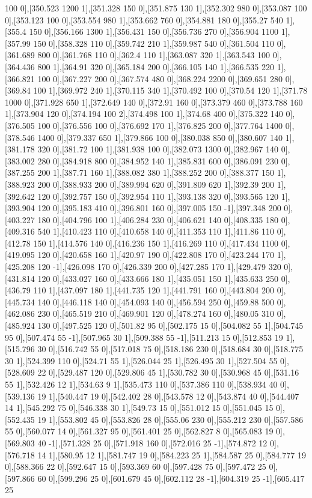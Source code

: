 {100 0],[350.523 1200 1],[351.328 150 0],[351.875 130 1],[352.302 980 0],[353.087 100 0],[353.123 100 0],[353.554 980 1],[353.662 760 0],[354.881 180 0],[355.27 540 1],[355.4 150 0],[356.166 1300 1],[356.431 150 0],[356.736 270 0],[356.904 1100 1],[357.99 150 0],[358.328 110 0],[359.742 210 1],[359.987 540 0],[361.504 110 0],[361.689 800 0],[361.768 110 0],[362.4 110 1],[363.087 320 1],[363.543 100 0],[364.436 800 1],[364.91 320 0],[365.184 200 0],[366.105 140 1],[366.535 220 1],[366.821 100 0],[367.227 200 0],[367.574 480 0],[368.224 2200 0],[369.651 280 0],[369.84 100 1],[369.972 240 1],[370.115 340 1],[370.492 100 0],[370.54 120 1],[371.78 1000 0],[371.928 650 1],[372.649 140 0],[372.91 160 0],[373.379 460 0],[373.788 160 1],[373.904 120 0],[374.194 100 2],[374.498 100 1],[374.68 400 0],[375.322 140 0],[376.505 100 0],[376.556 100 0],[376.692 170 1],[376.825 200 0],[377.764 1400 0],[378.546 1400 0],[379.337 650 1],[379.866 100 0],[380.038 850 0],[380.607 140 1],[381.178 320 0],[381.72 100 1],[381.938 100 0],[382.073 1300 0],[382.967 140 0],[383.002 280 0],[384.918 800 0],[384.952 140 1],[385.831 600 0],[386.091 230 0],[387.255 200 1],[387.71 160 1],[388.082 380 1],[388.252 200 0],[388.377 150 1],[388.923 200 0],[388.933 200 0],[389.994 620 0],[391.809 620 1],[392.39 200 1],[392.642 120 0],[392.757 150 0],[392.954 110 1],[393.138 320 0],[393.565 120 1],[393.904 120 0],[395.183 410 0],[396.801 160 0],[397.005 150 -1],[397.348 200 0],[403.227 180 0],[404.796 100 1],[406.284 230 0],[406.621 140 0],[408.335 180 0],[409.316 540 1],[410.423 110 0],[410.658 140 0],[411.353 110 1],[411.86 110 0],[412.78 150 1],[414.576 140 0],[416.236 150 1],[416.269 110 0],[417.434 1100 0],[419.095 120 0],[420.658 160 1],[420.97 190 0],[422.808 170 0],[423.244 170 1],[425.208 120 -1],[426.098 170 0],[426.339 200 0],[427.285 170 1],[429.479 320 0],[431.814 120 0],[433.027 160 0],[433.666 180 1],[435.051 150 1],[435.633 250 0],[436.79 110 1],[437.097 180 1],[441.735 120 1],[441.791 160 0],[443.804 200 0],[445.734 140 0],[446.118 140 0],[454.093 140 0],[456.594 250 0],[459.88 500 0],[462.086 230 0],[465.519 210 0],[469.901 120 0],[478.274 160 0],[480.05 310 0],[485.924 130 0],[497.525 120 0],[501.82 95 0],[502.175 15 0],[504.082 55 1],[504.745 95 0],[507.474 55 -1],[507.965 30 1],[509.388 55 -1],[511.213 15 0],[512.853 19 1],[515.796 30 0],[516.742 55 0],[517.018 75 0],[518.186 230 0],[518.684 30 0],[518.775 30 1],[524.399 110 0],[524.71 55 1],[526.044 25 1],[526.495 30 1],[527.504 55 0],[528.609 22 0],[529.487 120 0],[529.806 45 1],[530.782 30 0],[530.968 45 0],[531.16 55 1],[532.426 12 1],[534.63 9 1],[535.473 110 0],[537.386 110 0],[538.934 40 0],[539.136 19 1],[540.447 19 0],[542.402 28 0],[543.578 12 0],[543.874 40 0],[544.407 14 1],[545.292 75 0],[546.338 30 1],[549.73 15 0],[551.012 15 0],[551.045 15 0],[552.435 19 1],[553.802 45 0],[553.826 28 0],[555.06 230 0],[555.212 230 0],[557.586 55 0],[560.077 14 0],[561.327 95 0],[561.401 25 0],[562.827 8 0],[565.083 19 0],[569.803 40 -1],[571.328 25 0],[571.918 160 0],[572.016 25 -1],[574.872 12 0],[576.718 14 1],[580.95 12 1],[581.747 19 0],[584.223 25 1],[584.587 25 0],[584.777 19 0],[588.366 22 0],[592.647 15 0],[593.369 60 0],[597.428 75 0],[597.472 25 0],[597.866 60 0],[599.296 25 0],[601.679 45 0],[602.112 28 -1],[604.319 25 -1],[605.417 25 }
